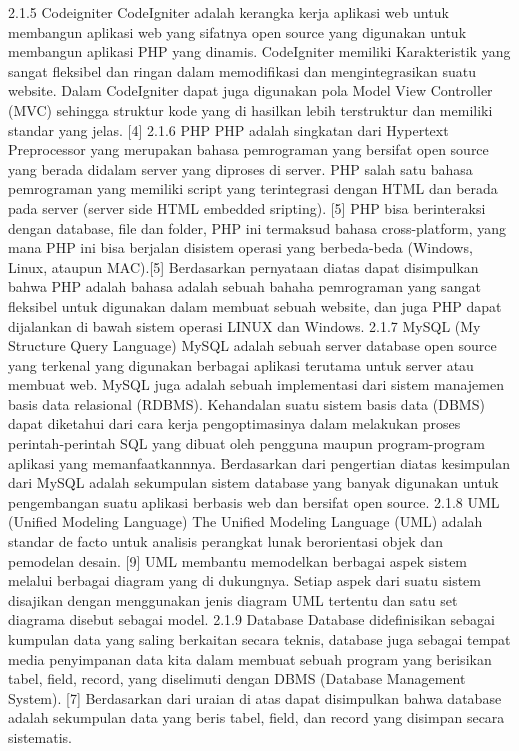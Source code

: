 2.1.5	Codeigniter
CodeIgniter adalah kerangka kerja aplikasi web untuk membangun aplikasi web yang sifatnya open source yang digunakan untuk membangun aplikasi PHP yang dinamis. CodeIgniter memiliki Karakteristik yang sangat fleksibel dan ringan dalam memodifikasi dan mengintegrasikan suatu website. Dalam CodeIgniter dapat juga digunakan pola Model View Controller (MVC) sehingga struktur kode yang di hasilkan lebih terstruktur dan memiliki standar yang jelas. [4]
2.1.6	PHP
PHP adalah singkatan dari Hypertext Preprocessor yang merupakan bahasa pemrograman yang bersifat open source yang berada didalam server yang diproses di server. PHP salah satu bahasa pemrograman yang memiliki script yang terintegrasi dengan HTML dan berada pada server (server side HTML embedded sripting). [5]
PHP bisa berinteraksi dengan database, file dan folder, PHP ini termaksud bahasa cross-platform, yang mana PHP ini bisa berjalan disistem operasi yang berbeda-beda (Windows, Linux, ataupun MAC).[5]
Berdasarkan pernyataan diatas dapat disimpulkan bahwa PHP adalah bahasa adalah sebuah bahaha pemrograman yang sangat fleksibel untuk digunakan dalam membuat sebuah website, dan juga PHP dapat dijalankan di bawah sistem operasi LINUX dan Windows.
2.1.7	MySQL (My Structure Query Language)
MySQL adalah sebuah server database open source yang terkenal yang digunakan berbagai aplikasi terutama untuk server atau membuat web. MySQL juga adalah sebuah implementasi dari sistem manajemen basis data relasional (RDBMS). Kehandalan suatu sistem basis data (DBMS) dapat diketahui dari cara kerja pengoptimasinya dalam melakukan proses perintah-perintah SQL yang dibuat oleh pengguna maupun program-program aplikasi yang memanfaatkannnya. 
		Berdasarkan dari pengertian diatas kesimpulan dari MySQL adalah sekumpulan sistem database yang banyak digunakan untuk pengembangan suatu aplikasi berbasis web dan bersifat open source.
2.1.8	UML (Unified Modeling Language)
The Unified Modeling Language (UML) adalah standar de facto untuk analisis perangkat lunak berorientasi objek dan pemodelan desain. [9] UML membantu memodelkan berbagai aspek sistem melalui berbagai diagram yang di dukungnya. Setiap aspek dari suatu sistem disajikan dengan menggunakan jenis diagram UML tertentu dan satu set diagrama disebut sebagai model.
2.1.9	Database 
Database didefinisikan sebagai kumpulan data yang saling berkaitan secara teknis, database juga sebagai tempat media penyimpanan data kita dalam membuat sebuah program yang berisikan tabel, field, record, yang diselimuti dengan DBMS (Database Management System). [7]
Berdasarkan dari uraian di atas dapat disimpulkan bahwa database adalah sekumpulan data yang beris tabel, field, dan record yang disimpan secara sistematis.
